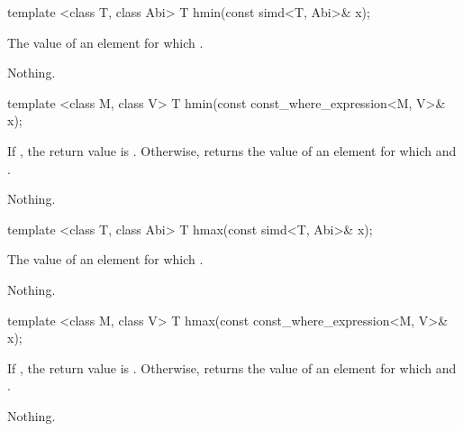 \begin{itemdecl}
template <class T, class Abi> T hmin(const simd<T, Abi>& x);
\end{itemdecl}
\begin{itemdescr}
  \pnum\returns The value of an element  for which  \foralli.

  \pnum\throws Nothing.
\end{itemdescr}

\begin{itemdecl}
template <class M, class V> T hmin(const const_where_expression<M, V>& x);
\end{itemdecl}
\begin{itemdescr}
  \pnum\returns If , the return value is .
  Otherwise, returns the value of an element  for which  and  \foralli.

  \pnum\throws Nothing.
\end{itemdescr}

\begin{itemdecl}
template <class T, class Abi> T hmax(const simd<T, Abi>& x);
\end{itemdecl}
\begin{itemdescr}
  \pnum\returns The value of an element  for which  \foralli.

  \pnum\throws Nothing.
\end{itemdescr}

\begin{itemdecl}
template <class M, class V> T hmax(const const_where_expression<M, V>& x);
\end{itemdecl}
\begin{itemdescr}
  \pnum\returns If , the return value is .
  Otherwise, returns the value of an element  for which  and  \foralli.

  \pnum\throws Nothing.
\end{itemdescr}


